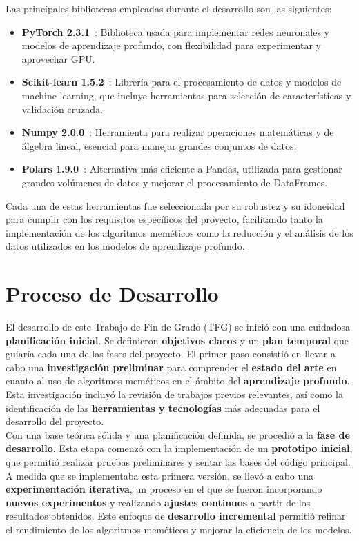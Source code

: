Las principales bibliotecas empleadas durante el desarrollo son las siguientes:
\begin{itemize}
    \item \textbf{PyTorch 2.3.1}~\cite{}: Biblioteca usada para implementar redes neuronales y modelos de aprendizaje
profundo, con flexibilidad para experimentar y aprovechar GPU\@.
    \item \textbf{Scikit-learn 1.5.2}~\cite{}: Librería para el procesamiento de datos y modelos de machine learning,
que incluye herramientas para selección de características y validación cruzada.
    \item \textbf{Numpy 2.0.0}~\cite{}: Herramienta para realizar operaciones matemáticas y de álgebra lineal, esencial
para manejar grandes conjuntos de datos.
    \item \textbf{Polars 1.9.0}~\cite{}: Alternativa más eficiente a Pandas, utilizada para gestionar grandes volúmenes
de datos y mejorar el procesamiento de DataFrames.
\end{itemize}

Cada una de estas herramientas fue seleccionada por su robustez y su idoneidad para cumplir con los requisitos
específicos del proyecto, facilitando tanto la implementación de los algoritmos meméticos como la reducción y el
análisis de los datos utilizados en los modelos de aprendizaje profundo. \\[6pt]

\section{Proceso de Desarrollo}\label{sec:proceso_de_desarrollo}
El desarrollo de este Trabajo de Fin de Grado (TFG) se inició con una cuidadosa \textbf{planificación inicial}.
Se definieron \textbf{objetivos claros} y un \textbf{plan temporal} que guiaría cada una de las fases del proyecto.
El primer paso consistió en llevar a cabo una \textbf{investigación preliminar} para comprender el
\textbf{estado del arte} en cuanto al uso de algoritmos meméticos en el ámbito del \textbf{aprendizaje profundo}.
Esta investigación incluyó la revisión de trabajos previos relevantes, así como la identificación de las
\textbf{herramientas y tecnologías} más adecuadas para el desarrollo del proyecto. \\[6pt]

Con una base teórica sólida y una planificación definida, se procedió a la \textbf{fase de desarrollo}.
Esta etapa comenzó con la implementación de un \textbf{prototipo inicial}, que permitió realizar pruebas preliminares y
sentar las bases del código principal.
A medida que se implementaba esta primera versión, se llevó a cabo una \textbf{experimentación iterativa}, un proceso
en el que se fueron incorporando \textbf{nuevos experimentos} y realizando \textbf{ajustes continuos} a partir de los
resultados obtenidos.
Este enfoque de \textbf{desarrollo incremental} permitió refinar el rendimiento de los algoritmos meméticos y mejorar la
eficiencia de los modelos. \\[6pt]

